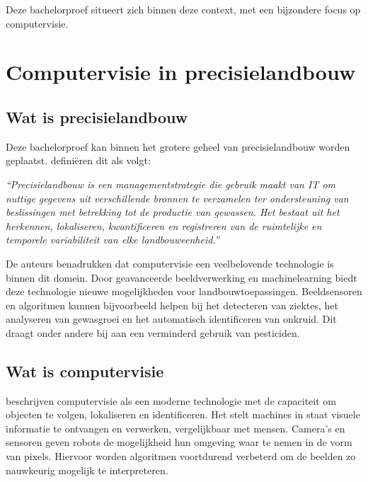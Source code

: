 Deze bachelorproef situeert zich binnen deze context, met een bijzondere focus op computervisie.

\section{Computervisie in precisielandbouw}


\subsection{Wat is precisielandbouw}
Deze bachelorproef kan binnen het grotere geheel van precisielandbouw worden geplaatst. \textcite{Cisternas2020} definiëren dit als volgt: 

\begin{tcolorbox}[colback=gray!5, colframe=white, sharp corners, boxrule=0pt, width=\linewidth]
    \textit{“Precisielandbouw is een managementstrategie die gebruik maakt van IT om nuttige gegevens uit verschillende bronnen te verzamelen ter ondersteuning van beslissingen met betrekking tot de productie van gewassen. Het bestaat uit het herkennen, lokaliseren, kwantificeren en registreren van de ruimtelijke en temporele variabiliteit van elke landbouweenheid.”} 
\end{tcolorbox}

De auteurs benadrukken dat computervisie een veelbelovende technologie is binnen dit domein. Door geavanceerde beeldverwerking en machinelearning biedt deze technologie nieuwe mogelijkheden voor landbouwtoepassingen. Beeldsensoren en algoritmen kunnen bijvoorbeeld helpen bij het detecteren van ziektes, het analyseren van gewasgroei en het automatisch identificeren van onkruid. Dit draagt onder andere bij aan een verminderd gebruik van pesticiden.

\subsection{Wat is computervisie}
\textcite{Radojcic2023} beschrijven computervisie als een moderne technologie met de capaciteit om objecten te volgen, lokaliseren en identificeren. Het stelt machines in staat visuele informatie te ontvangen en verwerken, vergelijkbaar met mensen. Camera’s en sensoren geven robots de mogelijkheid hun omgeving waar te nemen in de vorm van pixels. Hiervoor worden algoritmen voortdurend verbeterd om de beelden zo nauwkeurig mogelijk te interpreteren. 

